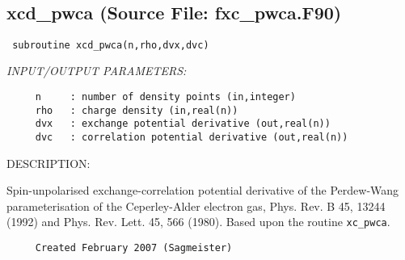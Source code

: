 \documentclass[11pt]{article}
\begin{document}





 
 
\mbox{}\hrulefill\ 
 
\subsection{xcd\_pwca (Source File: fxc\_pwca.F90)}


\begin{verbatim} subroutine xcd_pwca(n,rho,dvx,dvc)\end{verbatim}{\em INPUT/OUTPUT PARAMETERS:}
\begin{verbatim}     n     : number of density points (in,integer)
     rho   : charge density (in,real(n))
     dvx   : exchange potential derivative (out,real(n))
     dvc   : correlation potential derivative (out,real(n))\end{verbatim}
{\sf DESCRIPTION:\\ }


     Spin-unpolarised exchange-correlation potential derivative of the 
     Perdew-Wang
     parameterisation of the Ceperley-Alder electron gas,
     Phys. Rev. B 45, 13244
     (1992) and Phys. Rev. Lett. 45, 566 (1980). Based upon the routine
     {\tt xc\_pwca}.
  
\begin{verbatim}     Created February 2007 (Sagmeister)\end{verbatim}








 
 
\mbox{}\hrulefill\ 
 
\end{document}
